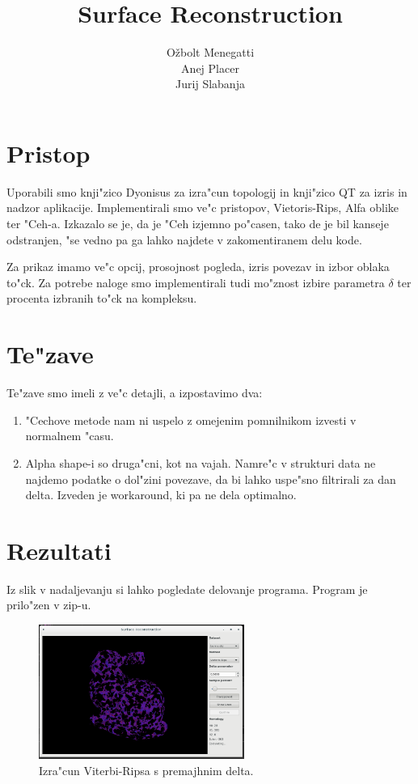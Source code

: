 \documentclass[11pt]{article}
\title{\textbf{Surface Reconstruction}}
\author{O\v zbolt Menegatti\\
		Anej Placer\\
		Jurij Slabanja}
\date{}
\begin{document}
\maketitle

\section{Pristop}

Uporabili smo knji"zico Dyonisus za izra"cun topologij in knji"zico QT za izris in nadzor aplikacije. Implementirali smo ve"c pristopov, Vietoris-Rips, Alfa oblike ter "Ceh-a. Izkazalo se je, da je "Ceh izjemno po"casen, tako de je bil kanseje odstranjen, "se vedno pa ga lahko najdete v zakomentiranem delu kode.

Za prikaz imamo ve"c opcij, prosojnost pogleda, izris povezav in izbor oblaka to"ck. Za potrebe naloge smo implementirali tudi mo"znost izbire parametra $\delta$ ter procenta izbranih to"ck na kompleksu.

\section{Te"zave}

Te"zave smo imeli z ve"c detajli, a izpostavimo dva:

\begin{enumerate}
\item "Cechove metode nam ni uspelo z omejenim pomnilnikom izvesti v normalnem "casu.
\item Alpha shape-i so druga"cni, kot na vajah. Namre"c v strukturi data ne najdemo podatke o dol"zini povezave, da bi lahko uspe"sno filtrirali za dan delta. Izveden je workaround, ki pa ne dela optimalno.
\end{enumerate}

\section{Rezultati}

Iz slik v nadaljevanju si lahko pogledate delovanje programa. Program je prilo"zen v zip-u.

\begin{figure}[htb]
    \centering
    \includegraphics[width=0.6\textwidth]{vr_long.png}
    \caption{Izra"cun Viterbi-Ripsa s premajhnim delta.}
    \label{fig:vr1}
\end{figure}
\end{document}
